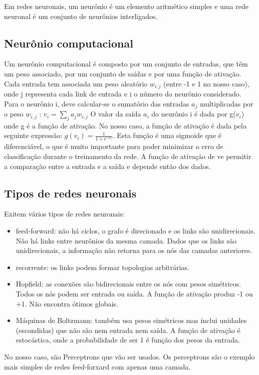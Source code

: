 \documentclass{article}
\begin{document}
 Em redes neuronais, um neurônio é um elemento aritmético simples e uma rede neuronal é um conjunto de neurônios interligados.


\subsection{Neurônio computacional}
\hspace{10 mm} Um neurônio computacional é composto por um conjunto de entradas, que têm um peso associado, por um conjunto de saídas e por uma função de ativação. Cada entrada tem associada um peso aleatório $ w_{i,j} $ (entre -1 e 1 no nosso caso), onde j representa cada link de entrada e i o número do neurônio considerado. Para o neurônio i, deve calcular-se o sumatório das entradas $ a_{j} $ multiplicadas por o peso $ w_{i,j} $ :
 $ \displaystyle { v_{i} = \sum_{j}^{}}  a_{j}  w_{i,j}  $
 O valor da saída $ a_{i}$ do neurônio i é dada por g($v_{i}$) onde g é a função de ativação. No nosso caso, a função de ativação é dada pela seguinte expressão:  $ g(v_{i}) = \frac{1}{1 + e^{-v_{i}}}$.
Esta função é uma sigmoide que é diferenciável, o que é muito importante para poder minimizar o erro de classificação durante o treinamento da rede. A função de ativação de ve permitir a comparação entre a entrada e a saída e depende então dos dados.

\subsection{Tipos de redes neuronais}
Exitem vários tipos de redes neuronais:
\begin{itemize}
  \item[\textbullet]{feed-forward: não há ciclos, o grafo é direcionado e os links são unidirecionais. Não há links entre neurônios da mesma camada. Dados que os links são unidirecionais, a informação não retorna para os nós das camadas anteriores.}
  \item[\textbullet]{recorrente: os links podem formar topologias arbitrárias.}
  \item[\textbullet]{Hopfield: as conexões são bidirecionais entre os nós com pesos simétricos. Todos os nós podem ser entrada ou saída. A função de ativação produz -1 ou +1. Não encontra ótimos globais.}
  \item[\textbullet]{Máquinas de Boltzmann: também usa pesos simétricos mas inclui unidades (escondidas) que não são nem entrada nem saída. A função de ativação é estocástica, onde a probabilidade de ser 1 é função dos pesos da entrada.}
\end{itemize}
No nosso caso, são Perceptrons que vão ser usados. Os perceptrons são o exemplo mais simples de redes feed-forxard com apenas uma camada.
\end{document}
